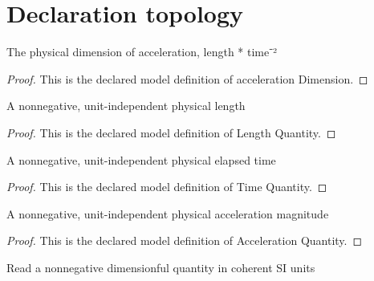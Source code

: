 \section{Declaration topology}
\begin{definition}
  \label{def:physics:phyx-mini-0689:phyxminiproblems-problemphyxmini0689-accelerationdimension}
  The physical dimension of acceleration, length * time⁻²
\end{definition}
\begin{proof}
  This is the declared model definition of acceleration Dimension.
\end{proof}
\begin{definition}
  \label{def:physics:phyx-mini-0689:phyxminiproblems-problemphyxmini0689-lengthquantity}
  A nonnegative, unit-independent physical length
\end{definition}
\begin{proof}
  This is the declared model definition of Length Quantity.
\end{proof}
\begin{definition}
  \label{def:physics:phyx-mini-0689:phyxminiproblems-problemphyxmini0689-timequantity}
  A nonnegative, unit-independent physical elapsed time
\end{definition}
\begin{proof}
  This is the declared model definition of Time Quantity.
\end{proof}
\begin{definition}
  \label{def:physics:phyx-mini-0689:phyxminiproblems-problemphyxmini0689-accelerationquantity}
  A nonnegative, unit-independent physical acceleration magnitude
\end{definition}
\begin{proof}
  This is the declared model definition of Acceleration Quantity.
\end{proof}
\begin{definition}
  \label{def:physics:phyx-mini-0689:phyxminiproblems-problemphyxmini0689-quantitysireadout}
  Read a nonnegative dimensionful quantity in coherent SI units
\end{definition}
